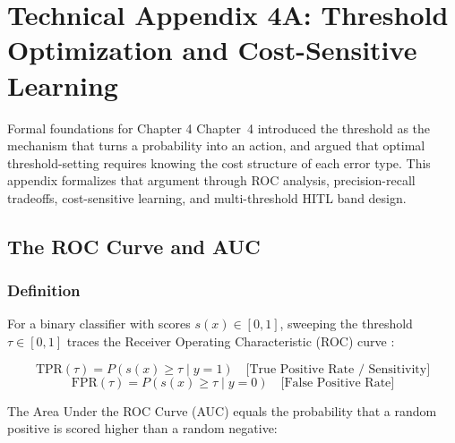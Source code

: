 
\chapter*{Technical Appendix 4A: Threshold Optimization and Cost-Sensitive Learning}

\begin{chapterquote}{Formal foundations for Chapter 4}
Chapter~4 introduced the threshold as the mechanism that turns a probability into an action, and argued that optimal threshold-setting requires knowing the cost structure of each error type. This appendix formalizes that argument through ROC analysis, precision-recall tradeoffs, cost-sensitive learning, and multi-threshold HITL band design.
\end{chapterquote}

\apxnumon
\section{The ROC Curve and AUC}

\subsection{Definition}

For a binary classifier with scores $s(x) \in [0,1]$, sweeping the threshold $\tau \in [0,1]$ traces the Receiver Operating Characteristic (ROC) curve \autocite{fawcett2006roc}:

\[
\mathrm{TPR}(\tau) = P\!\left(s(x) \geq \tau \mid y = 1\right) \quad \text{[True Positive Rate / Sensitivity]}
\]
\[
\mathrm{FPR}(\tau) = P\!\left(s(x) \geq \tau \mid y = 0\right) \quad \text{[False Positive Rate]}
\]

The Area Under the ROC Curve (AUC) equals the probability that a random positive is scored higher than a random negative:

